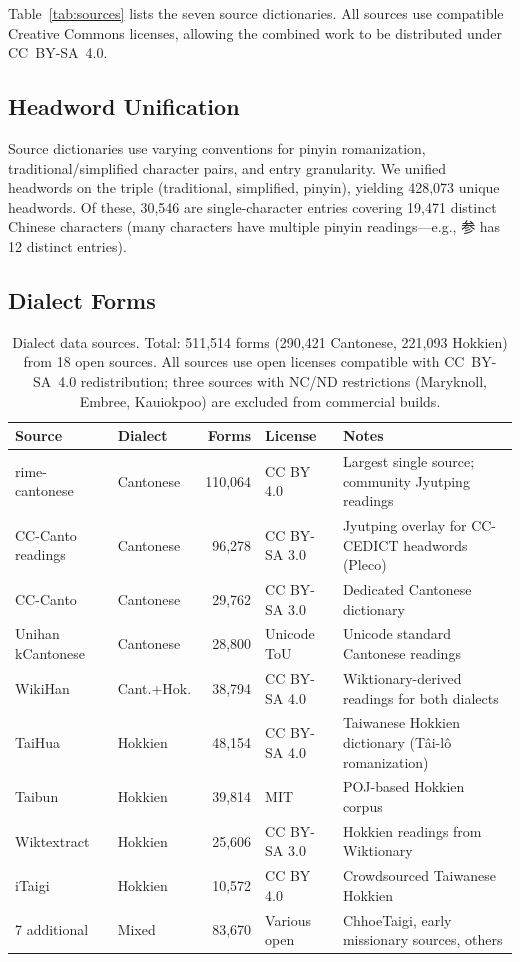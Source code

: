 \documentclass[11pt]{article}
\begin{document}
Table~\ref{tab:sources} lists the seven source dictionaries. All sources use compatible Creative Commons licenses, allowing the combined work to be distributed under CC~BY-SA~4.0.

\subsection{Headword Unification}

Source dictionaries use varying conventions for pinyin romanization, traditional/simplified character pairs, and entry granularity. We unified headwords on the triple (traditional, simplified, pinyin), yielding 428,073 unique headwords. Of these, 30,546 are single-character entries covering 19,471 distinct Chinese characters (many characters have multiple pinyin readings---e.g., 参 has 12 distinct entries).

\subsection{Dialect Forms}

\begin{table}[t]
\centering
\small
\begin{tabular}{llrlp{7cm}}
\toprule
\textbf{Source} & \textbf{Dialect} & \textbf{Forms} & \textbf{License} & \textbf{Notes} \\
\midrule
rime-cantonese     & Cantonese & 110,064 & CC BY 4.0     & Largest single source; community Jyutping readings \\
CC-Canto readings  & Cantonese &  96,278 & CC BY-SA 3.0  & Jyutping overlay for CC-CEDICT headwords (Pleco) \\
CC-Canto           & Cantonese &  29,762 & CC BY-SA 3.0  & Dedicated Cantonese dictionary \citep{cccanto} \\
Unihan kCantonese  & Cantonese &  28,800 & Unicode ToU   & Unicode standard Cantonese readings \\
WikiHan            & Cant.+Hok. & 38,794 & CC BY-SA 4.0 & Wiktionary-derived readings for both dialects \\
TaiHua             & Hokkien   &  48,154 & CC BY-SA 4.0  & Taiwanese Hokkien dictionary (Tâi-lô romanization) \\
Taibun             & Hokkien   &  39,814 & MIT           & POJ-based Hokkien corpus \\
Wiktextract        & Hokkien   &  25,606 & CC BY-SA 3.0  & Hokkien readings from Wiktionary \citep{wiktextract} \\
iTaigi             & Hokkien   &  10,572 & CC BY 4.0     & Crowdsourced Taiwanese Hokkien \citep{itaigi} \\
7 additional       & Mixed     &  83,670 & Various open  & ChhoeTaigi, early missionary sources, others \\
\bottomrule
\end{tabular}
\caption{Dialect data sources. Total: 511,514 forms (290,421 Cantonese, 221,093 Hokkien) from 18 open sources. All sources use open licenses compatible with CC~BY-SA~4.0 redistribution; three sources with NC/ND restrictions (Maryknoll, Embree, Kauiokpoo) are excluded from commercial builds.}
\label{tab:dialects}
\end{table}
\end{document}
